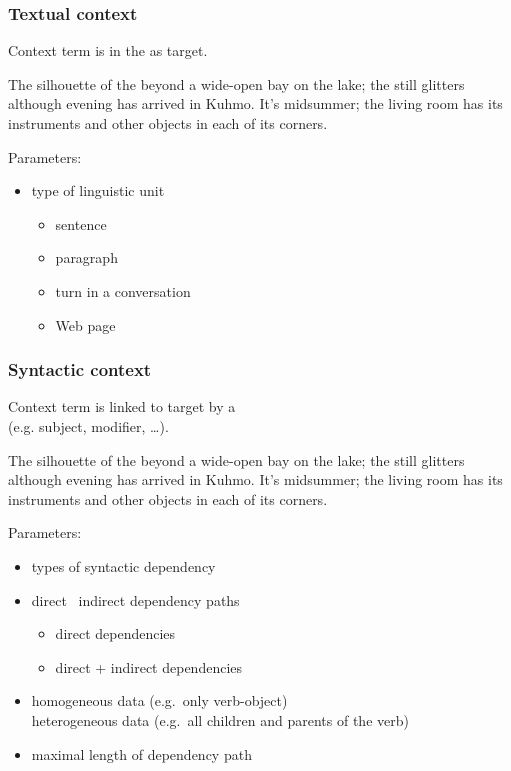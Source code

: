 \documentclass[t]{beamer} %
\begin{document}
\begin{frame}
  \frametitle{Textual context}
  
  \begin{center}
    Context term is in the  as target.
  \end{center}

  {\color{secondary}The silhouette of the} 
  {\color{secondary}beyond a wide-open bay on the lake; the}
   {\color{secondary}still glitters although evening has
    arrived in Kuhmo.} It's midsummer; the living room has its
  instruments and other objects in each of its corners.
  
  \gap
  Parameters:
  \begin{itemize}
  \item type of linguistic unit
    \begin{itemize}
    \item sentence
    \item paragraph
    \item turn in a conversation
    \item Web page
    \end{itemize}
  \end{itemize}
\end{frame}

\begin{frame}
  \frametitle{Syntactic context}
  
  \ungap
  \begin{center}
    Context term is linked to target by a \\
    (e.g. subject, modifier, \ldots).
  \end{center}

  The {\color{secondary}silhouette} of the  beyond a
  wide-open {\color{secondary}bay} on the lake; the 
  still {\color{secondary}glitters} although evening has arrived in
  Kuhmo. It's midsummer; the living room has its instruments and other
  objects in each of its corners.
  
  \gap
  Parameters:
  \begin{itemize}
  \item types of syntactic dependency \citep{Pado:Lapata:07}
  \item direct \vs\ indirect dependency paths
    \begin{itemize}
    \item direct dependencies
    \item direct + indirect dependencies
    \end{itemize}
  \item homogeneous data (e.g.\ only verb-object) \vs\\
    heterogeneous data (e.g.\ all children and parents of the verb)
  \item maximal length of dependency path
  \end{itemize}
\end{frame}
\end{document}
